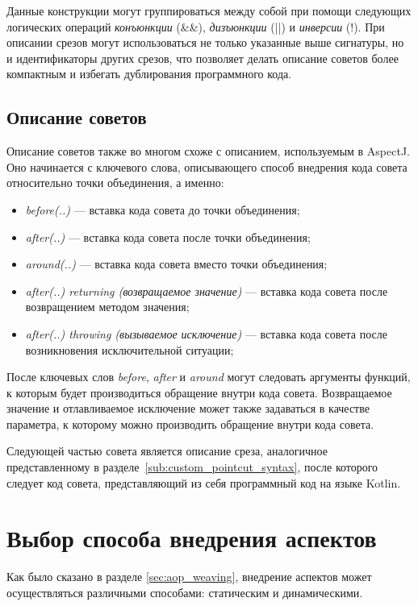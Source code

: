 Данные конструкции могут группироваться между собой при помощи следующих
логических операций \textit{конъюнкции} (\&\&),  \textit{дизъюнкции} (||)  и
\textit{инверсии} (!).
При описании срезов могут использоваться не только указанные выше сигнатуры, но
и идентификаторы других срезов, что позволяет делать описание советов более
компактным и избегать дублирования программного кода.
\subsection{Описание советов}
\label{sub:custom_advice_syntax}
Описание советов также во многом схоже с описанием, используемым в AspectJ.
Оно начинается с ключевого слова, описывающего способ внедрения
кода совета относительно точки объединения, а именно:
\begin{itemize}
	\item \textit{before(..)} --- вставка кода совета до точки объединения;
	\item \textit{after(..)} --- вставка кода совета после точки объединения;
	\item \textit{around(..)} --- вставка кода совета вместо точки объединения;
	\item \textit{after(..) returning (возвращаемое значение)} --- вставка кода совета после возвращением методом значения;
	\item \textit{after(..) throwing (вызываемое исключение)} --- вставка кода совета после возникновения исключительной ситуации;
\end{itemize}
После ключевых слов \textit{before}, \textit{after} и \textit{around} могут следовать аргументы функций, к которым будет производиться обращение внутри кода совета.
Возвращаемое значение и отлавливаемое исключение может также задаваться в качестве параметра, к которому можно производить обращение внутри кода совета.

Следующей частью совета является описание среза, аналогичное представленному в
разделе~\ref{sub:custom_pointcut_syntax}, после которого следует код совета,
представляющий из себя программный код на языке Kotlin.
\section{Выбор способа внедрения аспектов}
\label{sec:advice_weaving_choice}
Как было сказано в разделе \ref{sec:aop_weaving}, внедрение аспектов может осуществляться различными способами: статическим и динамическими.

